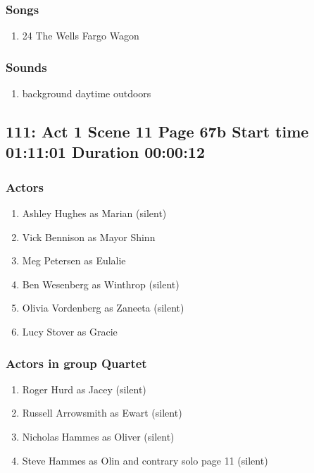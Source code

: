 \subsubsection{Songs}
\begin{enumerate}
\item 24 The Wells Fargo Wagon
\end{enumerate}\subsubsection{Sounds}
\begin{enumerate}
\item background daytime outdoors
\end{enumerate}
\subsection{111: Act 1 Scene 11 Page 67b Start time 01:11:01 Duration 00:00:12}

\subsubsection{Actors}
\begin{enumerate}
\item Ashley Hughes as Marian (silent)
\item Vick Bennison as Mayor Shinn
\item Meg Petersen as Eulalie
\item Ben Wesenberg as Winthrop (silent)
\item Olivia Vordenberg as Zaneeta (silent)
\item Lucy Stover as Gracie
\end{enumerate}
\subsubsection{Actors in group Quartet}
\begin{enumerate}
\item Roger Hurd as Jacey (silent)
\item Russell Arrowsmith as Ewart (silent)
\item Nicholas Hammes as Oliver (silent)
\item Steve Hammes as Olin and contrary solo page 11 (silent)
\end{enumerate}
